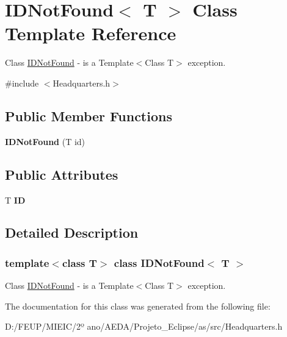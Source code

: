 \hypertarget{class_i_d_not_found}{}\section{I\+D\+Not\+Found$<$ T $>$ Class Template Reference}
\label{class_i_d_not_found}


Class \hyperlink{class_i_d_not_found}{I\+D\+Not\+Found} -\/ is a Template$<$\+Class T$>$ exception.  




{\ttfamily \#include $<$Headquarters.\+h$>$}

\subsection*{Public Member Functions}
\begin{DoxyCompactItemize}
\item 
\mbox{\label{class_i_d_not_found_a7a86d553e70eb30f833c372a7f19d111}} 
{\bfseries I\+D\+Not\+Found} (T id)
\end{DoxyCompactItemize}
\subsection*{Public Attributes}
\begin{DoxyCompactItemize}
\item 
\mbox{\label{class_i_d_not_found_a97036384d57c39d0389195678efe934a}} 
T {\bfseries ID}
\end{DoxyCompactItemize}


\subsection{Detailed Description}
\subsubsection*{template$<$class T$>$\newline
class I\+D\+Not\+Found$<$ T $>$}

Class \hyperlink{class_i_d_not_found}{I\+D\+Not\+Found} -\/ is a Template$<$\+Class T$>$ exception. 

The documentation for this class was generated from the following file\+:\begin{DoxyCompactItemize}
\item 
D\+:/\+F\+E\+U\+P/\+M\+I\+E\+I\+C/2º ano/\+A\+E\+D\+A/\+Projeto\+\_\+\+Eclipse/as/src/Headquarters.\+h\end{DoxyCompactItemize}

